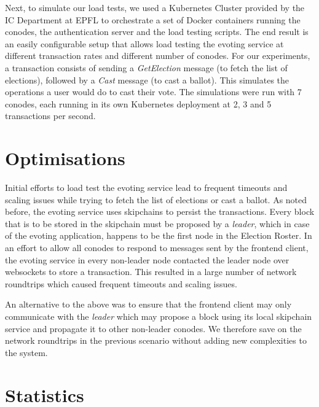 Next, to simulate our load tests, we used a Kubernetes Cluster provided by the IC Department at EPFL to orchestrate a set of Docker containers running the conodes, the authentication server and the load testing scripts. The end result is an easily configurable setup that allows load testing the evoting service at different transaction rates and different number of conodes. For our experiments, a transaction consists of sending a \textit{GetElection} message (to fetch the list of elections), followed by a \textit{Cast} message (to cast a ballot). This simulates the operations a user would do to cast their vote. The simulations were run with 7 conodes, each running in its own Kubernetes deployment at 2, 3 and 5 transactions per second.

\section{Optimisations}

Initial efforts to load test the evoting service lead to frequent timeouts and scaling issues while trying to fetch the list of elections or cast a ballot. As noted before, the evoting service uses skipchains to persist the transactions. Every block that is to be stored in the skipchain must be proposed by a \textit{leader}, which in case of the evoting application, happens to be the first node in the Election Roster. In an effort to allow all conodes to respond to messages sent by the frontend client, the evoting service in every non-leader node contacted the leader node over websockets to store a transaction. This resulted in a large number of network roundtrips which caused frequent timeouts and scaling issues.

An alternative to the above was to ensure that the frontend client may only communicate with the \textit{leader} which may propose a block using its local skipchain service and propagate it to other non-leader conodes. We therefore save on the network roundtrips in the previous scenario without adding new complexities to the system.

\section{Statistics}

